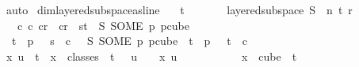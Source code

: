 \begin{isabellebody}
\ auto\isanewline
{}\isamarkupfalse%
%
\endisatagproof
{\isafoldproof}%
%
\isadelimproof
\isanewline
%
\endisadelimproof
\isanewline
{}\isamarkupfalse%
\ dim{}{\isacharunderscore}{\kern0pt}layered{\isacharunderscore}{\kern0pt}subspace{\isacharunderscore}{\kern0pt}as{\isacharunderscore}{\kern0pt}line{\isacharcolon}{\kern0pt}\isanewline
\ \ \ {\isachardoublequoteopen}t\ {\isachargreater}{\kern0pt}\ {}{\isachardoublequoteclose}\isanewline
\ \ \ \ \ {\isachardoublequoteopen}layered{\isacharunderscore}{\kern0pt}subspace\ S\ {}\ n\ t\ r\ {\isasymchi}{\isachardoublequoteclose}\isanewline
\ \ \ {\isachardoublequoteopen}{\isasymexists}c{}\ c{}{\isachardot}{\kern0pt}\ c{}{\isacharless}{\kern0pt}r\ {\isasymand}\ c{}{\isacharless}{\kern0pt}r\ {\isasymand}\ {\isacharparenleft}{\kern0pt}{\isasymforall}s{\isacharless}{\kern0pt}t{\isachardot}{\kern0pt}\ {\isasymchi}\ {\isacharparenleft}{\kern0pt}S\ {\isacharparenleft}{\kern0pt}SOME\ p{\isachardot}{\kern0pt}\ p{\isasymin}cube\ {}\isanewline
\ \ {\isacharparenleft}{\kern0pt}t{\isacharplus}{\kern0pt}{}{\isacharparenright}{\kern0pt}\ {\isasymand}\ p\ {}\ {\isacharequal}{\kern0pt}\ s{\isacharparenright}{\kern0pt}{\isacharparenright}{\kern0pt}\ {\isacharequal}{\kern0pt}\ c{}{\isacharparenright}{\kern0pt}\ {\isasymand}\ {\isasymchi}\ {\isacharparenleft}{\kern0pt}S\ {\isacharparenleft}{\kern0pt}SOME\ p{\isachardot}{\kern0pt}\ p{\isasymin}cube\ {}\ {\isacharparenleft}{\kern0pt}t{\isacharplus}{\kern0pt}{}{\isacharparenright}{\kern0pt}\ {\isasymand}\ p\ {}\ {\isacharequal}{\kern0pt}\ t{\isacharparenright}{\kern0pt}{\isacharparenright}{\kern0pt}\ {\isacharequal}{\kern0pt}\ c{}{\isachardoublequoteclose}\isanewline
%
\isadelimproof
%
\endisadelimproof
%
\isatagproof
{}\isamarkupfalse%
\ {\isacharminus}{\kern0pt}\isanewline
\ \ \isamarkupfalse%
\ {\isachardoublequoteopen}x\ u\ {\isacharless}{\kern0pt}\ t{\isachardoublequoteclose}\ \ {\isachardoublequoteopen}x\ {\isasymin}\ classes\ {}\ t\ {}{\isachardoublequoteclose}\ \ {\isachardoublequoteopen}u\ {\isacharless}{\kern0pt}\ {}{\isachardoublequoteclose}\ \ x\ u\ \isanewline
\ \ \isamarkupfalse%
\ {\isacharminus}{\kern0pt}\isanewline
\ \ \ \ \isamarkupfalse%
\ {\isachardoublequoteopen}x\ {\isasymin}\ cube\ {}\ {\isacharparenleft}{\kern0pt}t{\isacharplus}{\kern0pt}{}{\isacharparenright}{\kern0pt}{\isachardoublequoteclose}\ \isamarkupfalse%

\end{isabellebody}
